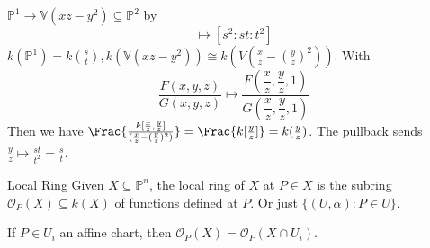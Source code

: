 \documentclass{report}
\begin{document}
\begin{examples}
    \begin{example}
        $\mathbb{P}^{1} \rightarrow \mathbb{V}(xz - y^{2}) \subseteq \mathbb{P}^{2}$ by 
            \begin{equation*}
                [s : t] \mapsto [s^{2}: st : t^{2}]
            \end{equation*}
        $k(\mathbb{P}^{1}) = k(\frac{s}{t}), k(\mathbb{V}(xz - y^{2})) \cong k(V(\frac{x}{z} - (\frac{y}{z})^{2}))$. With
            \begin{equation*}
                \dfrac{F(x, y, z)}{G(x, y, z)} \mapsto\dfrac{F(\dfrac{x}{z} ,\dfrac{y}{z}, 1)}{G(\dfrac{x}{z}, \dfrac{y}{z}, 1)}
            \end{equation*}
        Then we have $\Frac{\frac{k[\frac{x}{z}, \frac{y}{z}]}{(\frac{x}{z} - (\frac{y}{z})^{2})}} = \Frac{k[\frac{y}{z}]} = k(\frac{y}{z})$. The pullback sends $\frac{y}{z} \mapsto\frac{st}{t^{2}} = \frac{s}{t}$.
    \end{example}
\end{examples}

\begin{definition}{Local Ring}
    Given $X \subseteq \mathbb{P}^{n}$, the local ring of $X$ at $P \in X$ is the subring $\mathcal{O}_{P}(X) \subseteq k(X)$ of functions defined at $P$. Or just $\{(U, \alpha) : P \in U\}$.
\end{definition}

If $P \in U_{i}$ an affine chart, then $\mathcal{O}_{P}(X) = \mathcal{O}_{P}(X \cap U_{i})$.
\end{document}
